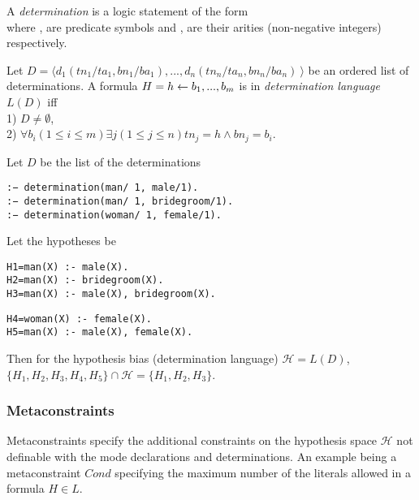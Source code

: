 \begin{defn}\cite{aleph2007}
A \emph{determination} is a logic statement of the form\\
where ,  are predicate symbols and
,  are their arities (non-negative integers) respectively.
\end{defn}

\begin{defn}\label{definition_determination_language}
Let $D=\langle d_1(tn_1/ta_1, bn_1/ba_1), ..., d_n(tn_n/ta_n, bn_n/ba_n)\ \rangle$ be an ordered list of determinations. A formula $H=h \leftarrow b_1, ..., b_m$ is in \emph{determination language} $L(D)$ iff\\
1) $D \not=\emptyset$,\\
2) $\forall b_i (1 \le i \le m) \exists j (1 \le j \le n) tn_j=h \land bn_j=b_i$.
\end{defn}

\begin{exmp}
Let $D$ be the list of the determinations
\begin{lstlisting}
:− determination(man/ 1, male/1).
:− determination(man/ 1, bridegroom/1).
:− determination(woman/ 1, female/1).
\end{lstlisting}
Let the hypotheses be

\begin{minipage}[t]{.50\textwidth}
\begin{lstlisting}
H1=man(X) :- male(X).
H2=man(X) :- bridegroom(X).
H3=man(X) :- male(X), bridegroom(X).
\end{lstlisting}
\end{minipage}
\begin{minipage}[t]{.50\textwidth}
\begin{lstlisting}
H4=woman(X) :- female(X).
H5=man(X) :- male(X), female(X).
\end{lstlisting}
\end{minipage}

Then for the hypothesis bias (determination language) $\mathcal{H}=L(D)$,
$\{H_1, H_2, H_3, H_4, H_5\} \cap \mathcal{H}=\{H_1, H_2, H_3\}$.
\end{exmp}

\subsubsection{Metaconstraints}
Metaconstraints specify the additional constraints on the hypothesis space $\mathcal{H}$ not definable with the mode declarations and determinations.
An example being a metaconstraint $Cond$ specifying the maximum number of the literals allowed in a formula $H \in L$.

